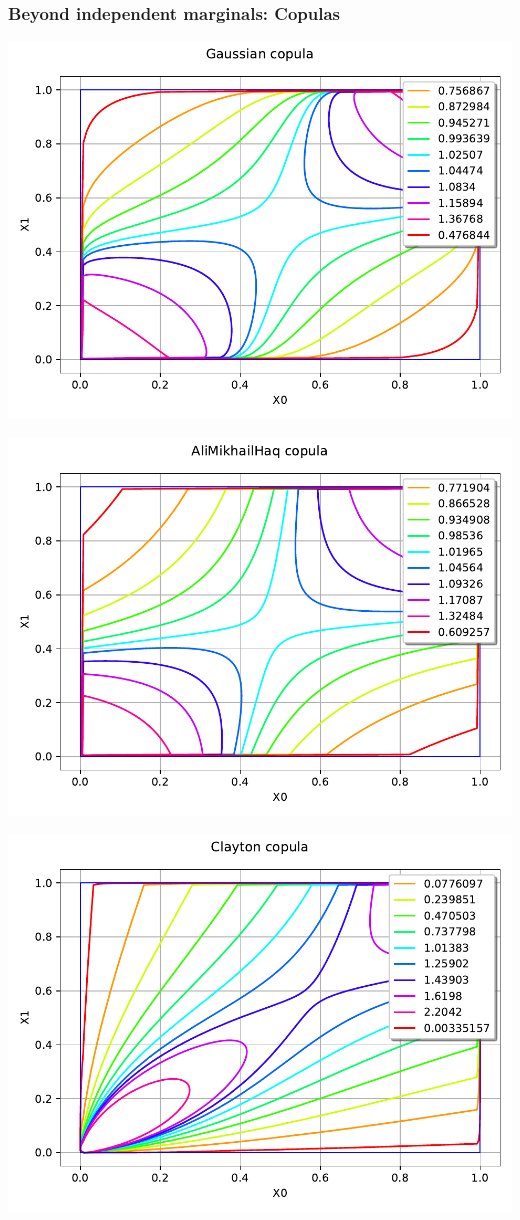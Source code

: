\documentclass[aspectratio=169]{beamer}
\begin{document}
\begin{frame}[containsverbatim]
{\begin{columns}
	
\end{columns}

}

\end{frame}



\begin{frame}[containsverbatim]
\frametitle{Beyond independent marginals: Copulas}

\begin{minipage}[t]{0.5\textwidth}
    \includegraphics[width=.65\textwidth]{figures/Copula1.pdf}

\end{minipage}%
\begin{minipage}[t]{0.5\textwidth}
    \includegraphics[width=.65\textwidth]{figures/Copula2.pdf}

\end{minipage}
\begin{minipage}[t]{0.5\textwidth}
    \includegraphics[width=.65\textwidth]{figures/Copula3.pdf}


\end{minipage}
\end{frame}
\end{document}
